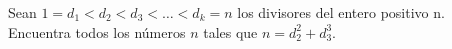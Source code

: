 Sean $1 = d_1 < d_2 < d_3 < \dots < d_k = n$ los divisores del entero positivo n. Encuentra todos
los números $n$ tales que $n = d_2^2+d_3^3$.
